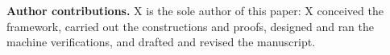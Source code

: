 \documentclass[11pt,a4paper]{article}
\theoremstyle{plain}
\theoremstyle{definition}
\theoremstyle{remark}
\begin{document}
\smallskip
\noindent\textbf{Author contributions.} X is the sole author of this
paper: X conceived the framework, carried out the constructions and
proofs, designed and ran the machine verifications, and drafted and
revised the manuscript.



\end{document}

